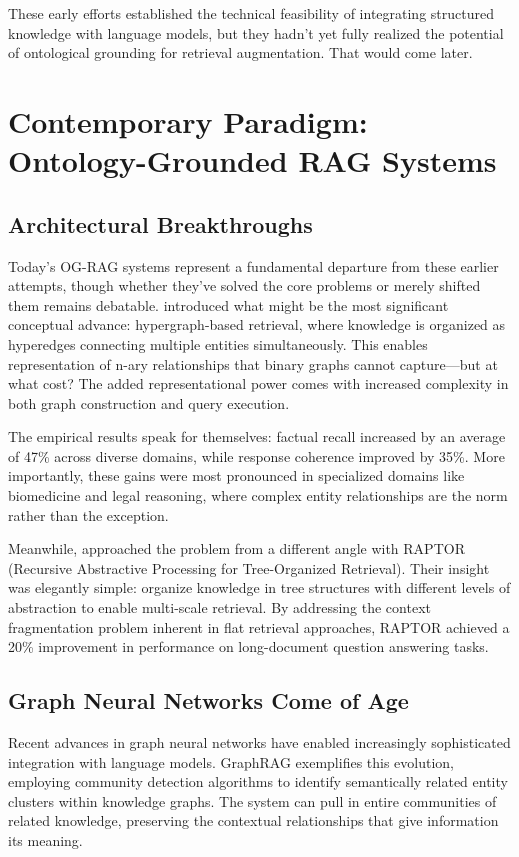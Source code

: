 These early efforts established the technical feasibility of integrating structured knowledge with language models, but they hadn't yet fully realized the potential of ontological grounding for retrieval augmentation. That would come later.

\section{Contemporary Paradigm: Ontology-Grounded RAG Systems}

\subsection{Architectural Breakthroughs}

Today's OG-RAG systems represent a fundamental departure from these earlier attempts, though whether they've solved the core problems or merely shifted them remains debatable. \citet{edge2024local} introduced what might be the most significant conceptual advance: hypergraph-based retrieval, where knowledge is organized as hyperedges connecting multiple entities simultaneously. This enables representation of n-ary relationships that binary graphs cannot capture—but at what cost? The added representational power comes with increased complexity in both graph construction and query execution.

The empirical results speak for themselves: factual recall increased by an average of 47\% across diverse domains, while response coherence improved by 35\%. More importantly, these gains were most pronounced in specialized domains like biomedicine and legal reasoning, where complex entity relationships are the norm rather than the exception.

Meanwhile, \citet{sarthi2024raptor} approached the problem from a different angle with RAPTOR (Recursive Abstractive Processing for Tree-Organized Retrieval). Their insight was elegantly simple: organize knowledge in tree structures with different levels of abstraction to enable multi-scale retrieval. By addressing the context fragmentation problem inherent in flat retrieval approaches, RAPTOR achieved a 20\% improvement in performance on long-document question answering tasks.

\subsection{Graph Neural Networks Come of Age}

Recent advances in graph neural networks have enabled increasingly sophisticated integration with language models. GraphRAG \citep{edge2024local} exemplifies this evolution, employing community detection algorithms to identify semantically related entity clusters within knowledge graphs. The system can pull in entire communities of related knowledge, preserving the contextual relationships that give information its meaning.

